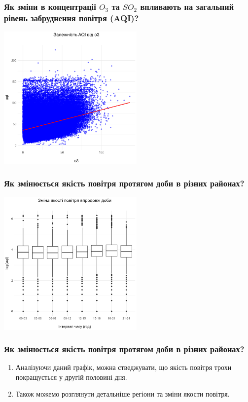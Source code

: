 \documentclass{beamer}
\begin{document}
\begin{frame}
  \frametitle{Як зміни в концентрації $O_3$ та $SO_2$ впливають на загальний рівень забруднення повітря (AQI)?}

  \begin{center}
    \includegraphics[height=2.8in]{plots/question2/scatter_plot.png}
  \end{center}
\end{frame}


\begin{frame}
  \frametitle{Як змінюється якість повітря протягом доби в різних районах?}

  \begin{center}
    \includegraphics[height=2.8in]{plots/question3/box.png}
  \end{center}
\end{frame}

\begin{frame}
  \frametitle{Як змінюється якість повітря протягом доби в різних районах?}

  \begin{enumerate}
    \item Аналізуючи даний графік, можна стведжувати, що якість повітря трохи
    покращується у другій половині дня.
    \item Також можемо розглянути детальніше регіони та зміни якости повітря.
  \end{enumerate}
\end{frame}
\end{document}
